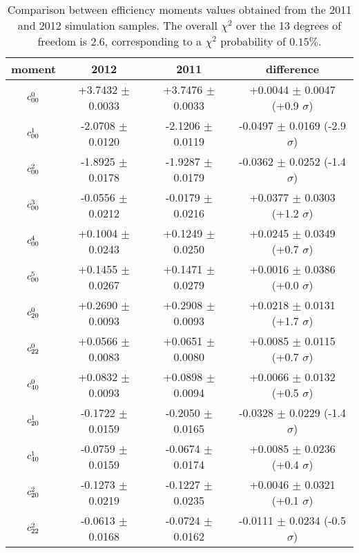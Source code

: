 \begin{table}
\centering
\footnotesize
\begin{tabular}{c c c c}
  \hline
        moment         &  2012    &    2011  &   difference                        \\
  \hline
  $c^{0}_{00}$   & +3.7432 $\pm$  0.0033  &  +3.7476 $\pm$  0.0033  &  +0.0044 $\pm$  0.0047 (+0.9 $\sigma$) \\
  $c^{1}_{00}$   & -2.0708 $\pm$  0.0120  &  -2.1206 $\pm$  0.0119  &  -0.0497 $\pm$  0.0169 (-2.9 $\sigma$) \\
  $c^{2}_{00}$   & -1.8925 $\pm$  0.0178  &  -1.9287 $\pm$  0.0179  &  -0.0362 $\pm$  0.0252 (-1.4 $\sigma$) \\
  $c^{3}_{00}$   & -0.0556 $\pm$  0.0212  &  -0.0179 $\pm$  0.0216  &  +0.0377 $\pm$  0.0303 (+1.2 $\sigma$) \\
  $c^{4}_{00}$   & +0.1004 $\pm$  0.0243  &  +0.1249 $\pm$  0.0250  &  +0.0245 $\pm$  0.0349 (+0.7 $\sigma$) \\
  $c^{5}_{00}$   & +0.1455 $\pm$  0.0267  &  +0.1471 $\pm$  0.0279  &  +0.0016 $\pm$  0.0386 (+0.0 $\sigma$) \\
  $c^{0}_{20}$   & +0.2690 $\pm$  0.0093  &  +0.2908 $\pm$  0.0093  &  +0.0218 $\pm$  0.0131 (+1.7 $\sigma$) \\
  $c^{0}_{22}$   & +0.0566 $\pm$  0.0083  &  +0.0651 $\pm$  0.0080  &  +0.0085 $\pm$  0.0115 (+0.7 $\sigma$) \\
  $c^{0}_{40}$   & +0.0832 $\pm$  0.0093  &  +0.0898 $\pm$  0.0094  &  +0.0066 $\pm$  0.0132 (+0.5 $\sigma$) \\
  $c^{1}_{20}$   & -0.1722 $\pm$  0.0159  &  -0.2050 $\pm$  0.0165  &  -0.0328 $\pm$  0.0229 (-1.4 $\sigma$) \\
  $c^{1}_{40}$   & -0.0759 $\pm$  0.0159  &  -0.0674 $\pm$  0.0174  &  +0.0085 $\pm$  0.0236 (+0.4 $\sigma$) \\
  $c^{2}_{20}$   & -0.1273 $\pm$  0.0219  &  -0.1227 $\pm$  0.0235  &  +0.0046 $\pm$  0.0321 (+0.1 $\sigma$) \\
  $c^{2}_{22}$   & -0.0613 $\pm$  0.0168  &  -0.0724 $\pm$  0.0162  &  -0.0111 $\pm$  0.0234 (-0.5 $\sigma$) \\
  \hline
\end{tabular}
\caption{Comparison between efficiency moments values obtained from the 2011 and 2012 \BsJpsiKst simulation samples.
         The overall $\chi^2$ over the 13 degrees of freedom is 2.6, corresponding to a $\chi^2$ probability of $0.15\%$.}
\label{moms_comp_periods_neg}
\end{table}

